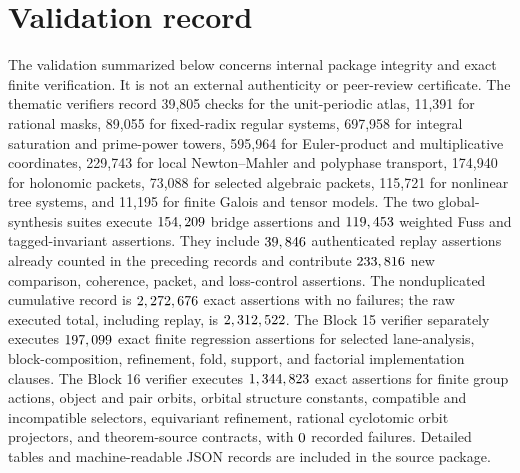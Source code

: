 \documentclass[11pt]{article}
\theoremstyle{definition}
\theoremstyle{remark}
\begin{document}





\clearpage


\clearpage


\clearpage
\section{Validation record}

The validation summarized below concerns internal package integrity and exact finite verification. It is not an external authenticity or peer-review certificate. The thematic verifiers record 39,805 checks for the unit-periodic atlas, 11,391 for rational masks, 89,055 for fixed-radix regular systems, 697,958 for integral saturation and prime-power towers, 595,964 for Euler-product and multiplicative coordinates, 229,743 for local Newton--Mahler and polyphase transport, 174,940 for holonomic packets, 73,088 for selected algebraic packets, 115,721 for nonlinear tree systems, and 11,195 for finite Galois and tensor models. The two global-synthesis suites execute \(154,209\) bridge assertions and \(119,453\) weighted Fuss and tagged-invariant assertions. They include \(39,846\) authenticated replay assertions already counted in the preceding records and contribute \(233,816\) new comparison, coherence, packet, and loss-control assertions. The nonduplicated cumulative record is \(2,272,676\) exact assertions with no failures; the raw executed total, including replay, is \(2,312,522\). The Block 15 verifier separately executes \(197,099\) exact finite regression assertions for selected lane-analysis, block-composition, refinement, fold, support, and factorial implementation clauses. The Block 16 verifier executes \(1,344,823\) exact assertions for finite group actions, object and pair orbits, orbital structure constants, compatible and incompatible selectors, equivariant refinement, rational cyclotomic orbit projectors, and theorem-source contracts, with \(0\) recorded failures. Detailed tables and machine-readable JSON records are included in the source package.
\end{document}
